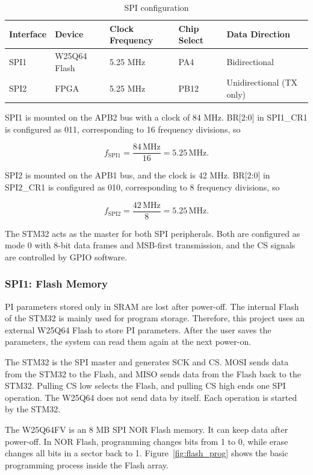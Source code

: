 \documentclass[12pt, a4paper]{report}
\begin{document}
\begin{table}[H]
\centering
\caption{SPI configuration}
\label{tab:spi_config}
\small
\begin{tabular}{@{}p{}p{}p{}p{}p{}@{}}
\toprule
Interface & Device & Clock Frequency & Chip Select & Data Direction \\
\midrule
SPI1 & W25Q64 Flash & 5.25 MHz & PA4 & Bidirectional \\
SPI2 & FPGA & 5.25 MHz & PB12 & Unidirectional (TX only) \\
\bottomrule
\end{tabular}
\end{table}

SPI1 is mounted on the APB2 bus with a clock of 84 MHz. BR[2:0] in SPI1\_CR1 is configured as 011, corresponding to 16 frequency divisions, so

\[
f_{\text{SPI1}}=\frac{84\,\text{MHz}}{16}=5.25\,\text{MHz}.
\]

SPI2 is mounted on the APB1 bus, and the clock is 42 MHz. BR[2:0] in SPI2\_CR1 is configured as 010, corresponding to 8 frequency divisions, so

\[
f_{\text{SPI2}}=\frac{42\,\text{MHz}}{8}=5.25\,\text{MHz}.
\]

The STM32 acts as the master for both SPI peripherals. Both are configured as mode 0 with 8-bit data frames and MSB-first transmission, and the CS signals are controlled by GPIO software.


\subsubsection{SPI1: Flash Memory}

PI parameters stored only in SRAM are lost after power-off. The internal Flash of the STM32 is mainly used for program storage. Therefore, this project uses an external W25Q64 Flash to store PI parameters. After the user saves the parameters, the system can read them again at the next power-on.

The STM32 is the SPI master and generates SCK and CS. MOSI sends data from the STM32 to the Flash, and MISO sends data from the Flash back to the STM32. Pulling CS low selects the Flash, and pulling CS high ends one SPI operation. The W25Q64 does not send data by itself. Each operation is started by the STM32.

The W25Q64FV is an 8 MB SPI NOR Flash memory. It can keep data after power-off. In NOR Flash, programming changes bits from 1 to 0, while erase changes all bits in a sector back to 1. Figure~\ref{fig:flash_prog} shows the basic programming process inside the Flash array.
\end{document}
